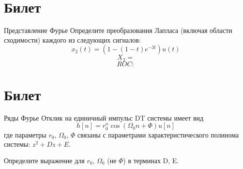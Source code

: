 \documentclass{exam}
\begin{document}
\vspace{15pt}

\section{Билет}
\begin{questions}
	\question 
Представление Фурье 
	\question 
Определите преобразования Лапласа (включая области сходимости) каждого из следующих сигналов:
	\[	
		x_2(t)=(1-(1-t)e^{-3t})u(t)
		\]
		\[X_2=\]
		\[ROC:\]

\end{questions}
\vspace{15pt}

\section{Билет}
\begin{questions}
	\question 
Ряды Фурье 
	\question 
Отклик на единичный импульс DT системы имеет вид
	\[
h[n]=r_0^n\cos(\Omega_0n+\Phi)u[n]
\]
где параметры \(r_0\), \(\Omega_0\), \(\Phi\) связаны 
с параметрами характеристического полинома системы:
\(z^2+Dz+E\).

	Определите выражение для 
		\(r_0\), \(\Omega_0\) (не \(\Phi\))
		в терминах D, E.


\end{questions}
\vspace{15pt}
\end{document}
